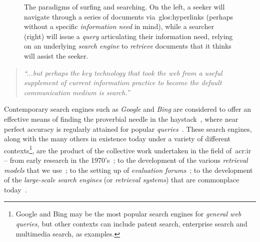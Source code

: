 \begin{figure}[t!]
    \centering
    \caption[Surfing vs. Searching]{The paradigms of surfing and searching. On the left, a seeker will navigate through a series of documents via~\glspl{glos:hyperlink} (perhaps without a specific \emph{information need} in mind), while a searcher (right) will issue a \emph{query} articulating their information need, relying on an underlying \emph{search engine} to \emph{retrieve} documents that it thinks will assist the seeker.}
    \label{fig:ch1-surfing}
\end{figure}

\begin{quote}
    \emph{``...but perhaps the key technology that took the web from a useful supplement of current information practice to become the default communication medium is search.''}
\end{quote}

Contemporary search engines such as \emph{Google} and \emph{Bing} are considered to offer an effective means of finding the proverbial needle in the haystack~\citep{wilson2010keyword_search}, where near perfect accuracy is regularly attained for popular \emph{queries}~\citep{vaughan2004new_measurements}. These search engines, along with the many others in existence today under a variety of different contexts\footnote{Google and Bing may be the most popular search engines for \emph{general web queries,} but other contexts can include patent search, enterprise search and multimedia search, as examples.}, are the product of the collective work undertaken in the field of~\gls{acr:ir} -- from early research in the 1970's~\citep{cleverdon1962cranfield_experiments,rijsbergen1979ir}; to the development of the various \emph{retrieval models} that we use~\citep{robertson2009probabilistic_models}; to the setting up of \emph{evaluation forums}~\citep{harman1993trec1}; to the development of the \emph{large-scale search engines} (or \emph{retrieval systems}) that are commonplace today~\citep{baezayates1999modern_ir, wang2010language_models}.

